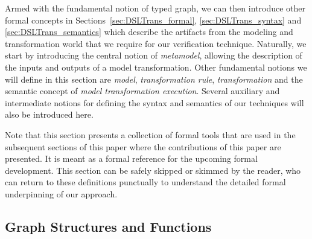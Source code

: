 

Armed with the fundamental notion of typed graph, we can then introduce other formal concepts in Sections~\ref{sec:DSLTrans_formal}, \ref{sec:DSLTrans_syntax} and \ref{sec:DSLTrans_semantics} which describe the artifacts from the modeling and transformation world that we require for our verification technique. Naturally, we start by introducing the central notion of \emph{metamodel}, allowing the description of the inputs and outputs of a model transformation. Other fundamental notions we will define in this section are \emph{model}, \emph{transformation rule}, \emph{transformation} and the semantic concept of \emph{model transformation execution}. Several auxiliary and intermediate notions for defining the syntax and semantics of our techniques will also be introduced here. 

Note that this section presents a collection of formal tools that are used in the subsequent sections of this paper where the contributions of this paper are presented. It is meant as a formal reference for the upcoming formal development. This section can be safely skipped or skimmed by the reader, who can return to these definitions punctually to understand the detailed formal underpinning of our approach. 



\newcommand{\defineggprime}{Let $\langle V,E,(s,t),\tau,VT,ET\rangle = g$, and\\ $\langle V',E',(s',t'),\tau',VT',ET'\rangle = g'$, where $g, g' \in \textsc{Tg}$.}

\newcommand{\ET}{\mathit{ET}}
\newcommand{\VT}{\mathit{VT}}



\subsection{Graph Structures and Functions}
\label{sec:typed_graphs}


